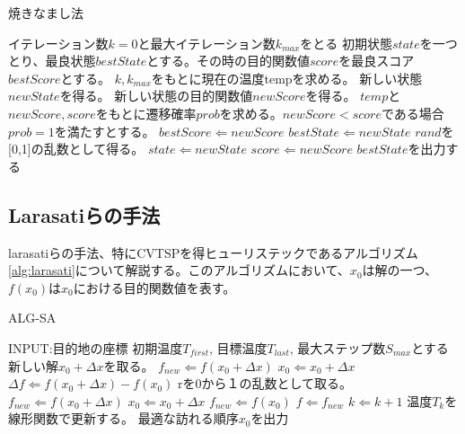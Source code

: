 \documentclass[11pt,a4paper,dvipdfmx,titlepage,uplatex]{jsarticle}
\theoremstyle{mystyle}
\newcommand{\0}{\mathbf{0}}
\begin{document}
	
	\begin{algorithm}[tb]
		\caption{焼きなまし法}
		\label{alg:SimulatedAnnealing}
		\begin{algorithmic}[1]
			\STATE イテレーション数$k = 0$と最大イテレーション数$k_{max}$をとる
			\STATE 初期状態$state$を一つとり、最良状態$bestState$とする。その時の目的関数値$score$を最良スコア$bestScore$とする。
			\STATE $k, k_{max}$をもとに現在の温度tempを求める。
			\STATE 新しい状態$newState$を得る。
			\STATE 新しい状態の目的関数値$newScore$を得る。
			\STATE $temp$と$newScore,score$をもとに遷移確率$prob$を求める。$newScore<score$である場合$prob=1$を満たすとする。
			\STATE $bestScore \Leftarrow newScore$
			\STATE $bestState  \Leftarrow newState$
			\ENDIF
			\STATE $rand$を[0,1]の乱数として得る。
			\STATE $state \Leftarrow newState$
			\STATE $score  \Leftarrow  newScore$
			\ENDIF
			\ENDWHILE
			\STATE $bestState$を出力する
		\end{algorithmic}
	\end{algorithm}
	
	
	
	\subsection{Larasatiらの手法}\label{larasati}
	larasatiらの手法\cite{larasati2022integrated}、特にCVTSPを得ヒューリステックであるアルゴリズム\ref{alg:larasati}について解説する。このアルゴリズムにおいて、$x_0$は解の一つ、$f(x_0)はx_0$における目的関数値を表す。
	
	
	
	\begin{algorithm}[tb]
		\caption{ALG-SA}
		\label{alg:larasati}
		\begin{algorithmic}[1]
			\STATE INPUT:目的地の座標
			\STATE 初期温度$T_{first}$, 目標温度$T_{last}$, 最大ステップ数$S_{max}$とする
			\STATE 新しい解$x_0+\Delta x$を取る。
			\STATE $f_{new} \Leftarrow f(x_0+\Delta x)$
			\STATE $x_0 \Leftarrow x_0+\Delta x$
			\ELSE
			\STATE $\Delta f \Leftarrow f(x_0+\Delta x) - f(x_0)$
			\STATE rを0から１の乱数として取る。
			\STATE $f_{new} \Leftarrow f(x_0+\Delta x)$
			\STATE $x_0 \Leftarrow x_0+\Delta x$
			\ELSE
			\STATE $f_{new} \Leftarrow f(x_0)$
			\ENDIF
			\ENDIF
			\ENDFOR
			\STATE $f \Leftarrow f_{new}$
			\STATE $k\Leftarrow k+1$
			\STATE 温度$T_k$を線形関数で更新する。
			\ENDWHILE
			\STATE 最適な訪れる順序$x_0$を出力
		\end{algorithmic}
	\end{algorithm}
	
\end{document}
